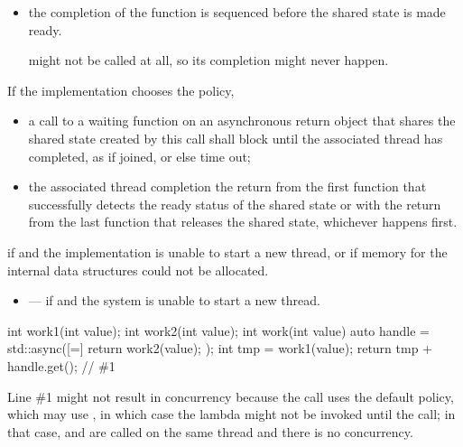 \begin{itemdescr}
\begin{itemize}
\item
the completion of the function  is sequenced before the
shared state is made ready.
\begin{note}
 might not be called at all,
so its completion might never happen.
\end{note}
\end{itemize}

If the implementation chooses the  policy,
\begin{itemize}
\item
a call to a waiting function on an asynchronous return
object that shares the shared state created by this  call shall
block until the associated thread has completed, as if joined, or else time
out;
\item
the associated thread completion
the return from
the first function
that successfully detects the ready status of the shared state or
with the return from the last
function that releases the shared state, whichever
happens first.
\end{itemize}

\pnum
\throws
{} if  and the
implementation is unable to start a new thread, or
 if memory for the internal data structures
could not be allocated.

\pnum
\errors
\begin{itemize}
\item {} --- if
 and the system is unable to start a new thread.
\end{itemize}
\end{itemdescr}

\pnum
\begin{example}
\begin{codeblock}
int work1(int value);
int work2(int value);
int work(int value) {
  auto handle = std::async([=]{ return work2(value); });
  int tmp = work1(value);
  return tmp + handle.get();    // \#1
}
\end{codeblock}

\begin{note}
Line \#1 might not result in concurrency because
the  call uses the default policy, which may use
, in which case the lambda might not be invoked until the
 call; in that case,  and  are called on the
same thread and there is no concurrency.
\end{note}
\end{example}

